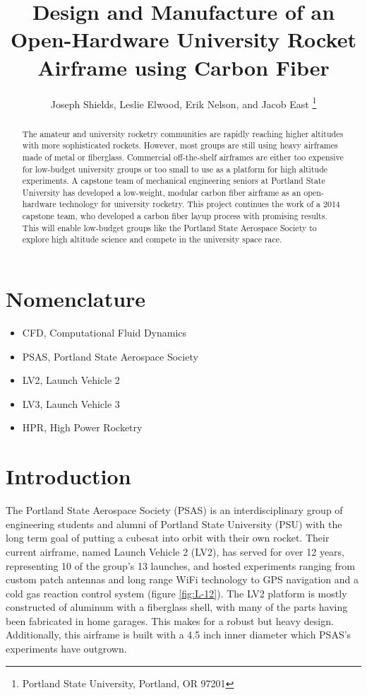 \documentclass{aiaa-tc}%
\title{Design and Manufacture of an Open-Hardware 
 	University Rocket Airframe using Carbon Fiber}
\author{
Joseph Shields, Leslie Elwood, Erik Nelson, and Jacob East%
	\thanks{Portland State University, Portland, OR 97201}
 }
\begin{document}
\maketitle

\begin{abstract}
The amateur and university rocketry communities are rapidly reaching higher altitudes with more sophisticated rockets. However, most groups are still using heavy airframes made of metal or fiberglass. Commercial off-the-shelf airframes are either too expensive for low-budget university groups or too small to use as a platform for high altitude experiments. 
A capstone team of mechanical engineering seniors at Portland State University has developed a low-weight, modular carbon fiber airframe as an open-hardware technology for university rocketry. 
This project continues the work of a 2014 capstone team, who developed a carbon fiber layup process with promising results. 
This will enable low-budget groups like the Portland State Aerospace Society to explore high altitude science and compete in the university space race.  \end{abstract}
\section*{Nomenclature}
\begin{itemize}
	\item CFD, Computational Fluid Dynamics
	\item PSAS, Portland State Aerospace Society
	\item LV2, Launch Vehicle 2
	\item LV3, Launch Vehicle 3
	\item HPR, High Power Rocketry
\end{itemize}


\section{Introduction}
The Portland State Aerospace Society (PSAS) is an interdisciplinary group of engineering students and alumni of Portland State University (PSU) with the long term goal of putting a cubesat into orbit with their own rocket. 
Their current airframe, named Launch Vehicle 2 (LV2), has served for over 12 years, representing 10 of the group's 13 launches, and hosted experiments ranging from custom patch antennas and long range WiFi technology to GPS navigation and a cold gas reaction control system (figure \ref{fig:L-12}). The LV2 platform is mostly constructed of aluminum with a fiberglass shell, with many of the parts having been fabricated in home garages. This makes for a robust but heavy design. Additionally, this airframe is built with a 4.5 inch inner diameter which PSAS's experiments have outgrown. 
\end{document}
